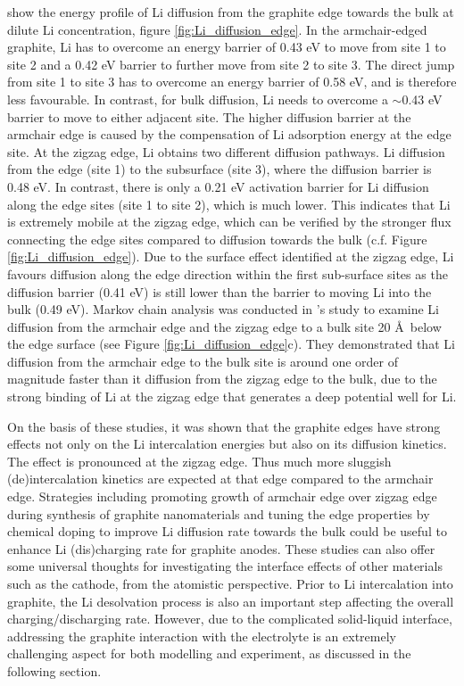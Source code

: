 \documentclass[../main.tex]{subfiles}
\begin{document}
\citeauthor{peng2020lithium} show the energy profile of Li diffusion from the graphite edge towards the bulk at dilute Li concentration, figure \ref{fig:Li_diffusion_edge}. In the armchair-edged graphite, Li has to overcome an energy barrier of 0.43 eV to move from site 1 to site 2 and a 0.42 eV barrier to further move from site 2 to site 3. The direct jump from site 1 to site 3 has to overcome an energy barrier of 0.58 eV, and is therefore less favourable. In contrast, for bulk diffusion, Li needs to overcome a $\sim$0.43 eV barrier to move to either adjacent site. The higher diffusion barrier at the armchair edge is caused by the compensation of Li adsorption energy at the edge site. At the zigzag edge, Li obtains two different diffusion pathways. Li diffusion from the edge (site 1) to the subsurface (site 3), where the diffusion barrier is 0.48 eV. In contrast, there is only a 0.21 eV activation barrier for Li diffusion along the edge sites (site 1 to site 2), which is much lower. This indicates that Li is extremely mobile at the zigzag edge, which can be verified by the stronger flux connecting the edge sites compared to diffusion towards the bulk (c.f. Figure \ref{fig:Li_diffusion_edge}). Due to the surface effect identified at the zigzag edge, Li favours diffusion along the edge direction within the first sub-surface sites as the diffusion barrier (0.41 eV) is still  lower than the barrier to moving Li into the bulk (0.49 eV). Markov chain analysis was conducted in \citeauthor{peng2020lithium}'s study to examine Li diffusion from the armchair edge and the zigzag edge to a bulk site 20 \AA \ below the edge surface (see Figure \ref{fig:Li_diffusion_edge}c). They demonstrated that Li diffusion from the armchair edge to the bulk site is around one order of magnitude faster than it diffusion from the zigzag edge to the bulk, due to the strong binding of Li at the zigzag edge that generates a deep potential well for Li.\cite{peng2020lithium}

On the basis of these studies, it was shown that the graphite edges have strong effects not only on the Li intercalation energies but also on its diffusion kinetics.\cite{leggesse2016lithium,peng2020lithium} The effect is pronounced at the zigzag edge.\cite{bernardo2015influence,velicky2019electrochemistry,gerischer1985interpretation} Thus much more sluggish (de)intercalation kinetics are expected at that edge compared to the armchair edge. Strategies including promoting growth of armchair edge over zigzag edge during synthesis of graphite nanomaterials and tuning the edge properties by chemical doping to improve Li diffusion rate towards the bulk could be useful to enhance Li (dis)charging rate for graphite anodes.\cite{weydanz1994behavior,way1994effect,endo2001scanning} These studies can also offer some universal thoughts for investigating the interface effects of other materials such as the cathode, from the atomistic perspective. Prior to Li intercalation into graphite, the Li desolvation process is also an important step affecting the overall charging/discharging rate. However, due to the complicated solid-liquid interface, addressing the graphite interaction with the electrolyte is an extremely challenging aspect for both modelling and experiment, as discussed in the following section.
\end{document}
